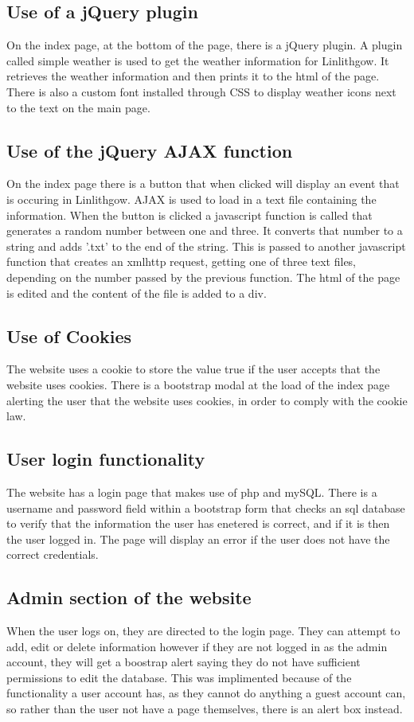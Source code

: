 \documentclass[12pt,a4paper]{article}
\begin{document}
		\subsection{Use of a jQuery plugin}
		On the index page, at the bottom of the page, there is a jQuery plugin. A plugin called simple weather is used to get the weather information for Linlithgow. It retrieves the weather information and then prints it to the html of the page. There is also a custom font installed through CSS to display weather icons next to the text on  the main page.

		\subsection{Use of the jQuery AJAX function}
		On the index page there is a button that when clicked will display an event that is occuring in Linlithgow. AJAX is used to load in a text file containing the information. When the button is clicked a javascript function is called that generates a random number between one and three. It converts that number to a string and adds '.txt' to the end of the string. This is passed to another javascript function that creates an xmlhttp request, getting one of three text files, depending on  the number passed by the previous function. The html of the page is edited and the content of the file is added to a div.

		\subsection{Use of Cookies}
		The website uses a cookie to store the value true if the user accepts that the website uses cookies. There is a bootstrap modal at the load of the index page alerting the user that the website uses cookies, in order to comply with the cookie law.

		\subsection{User login functionality}
		The website has a login page that makes use of php and mySQL. There is a username and password field within a bootstrap form that checks an sql database to verify that the information the user has enetered is correct, and if it is then the user logged in. The page will display an error if the user does not have the correct credentials.

		\subsection{Admin section of the website}
		When the user logs on, they are directed to the login page. They can attempt to add, edit or delete information however if they are not logged in as the admin account, they will get a boostrap alert saying they do not have sufficient permissions to edit the database. This was implimented because of the functionality a user account has, as they cannot do anything a guest account can, so rather than the user not have a page themselves, there is an alert box instead.
\end{document}
